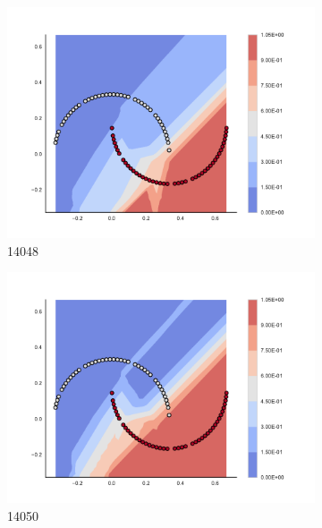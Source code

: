 \begin{figure}[h]
\begin{subfigure}[b]{0.09\textwidth}
    \includegraphics[clip, trim=2.35cm 1.75cm 4.5cm 0cm,width=\textwidth]{img/convergence/14048.pdf}
    \caption{14048}
    \label{fig:convergence_14048}
\end{subfigure}
%
\begin{subfigure}[b]{0.09\textwidth}
    \includegraphics[clip, trim=2.35cm 1.75cm 4.5cm 0cm,width=\textwidth]{img/convergence/14050.pdf}
    \caption{14050}
    \label{fig:convergence_14050}
\end{subfigure}
%
\begin{subfigure}[b]{0.09\textwidth}

\end{subfigure}
\end{figure}
